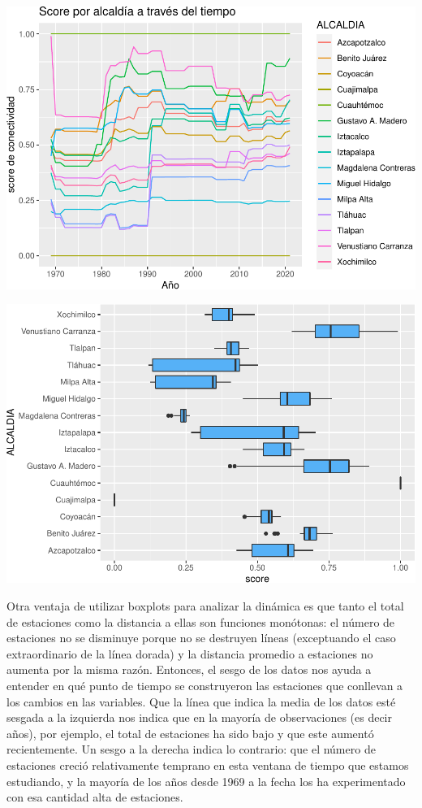 \documentclass[
  spanish,
]{article}
\begin{document}
\begin{center}\includegraphics{proyecto_files/figure-latex/unnamed-chunk-27-1} \end{center}

\begin{center}\includegraphics{proyecto_files/figure-latex/unnamed-chunk-28-1} \end{center}

Otra ventaja de utilizar boxplots para analizar la dinámica es que tanto
el total de estaciones como la distancia a ellas son funciones
monótonas: el número de estaciones no se disminuye porque no se
destruyen líneas (exceptuando el caso extraordinario de la línea dorada)
y la distancia promedio a estaciones no aumenta por la misma razón.
Entonces, el sesgo de los datos nos ayuda a entender en qué punto de
tiempo se construyeron las estaciones que conllevan a los cambios en las
variables. Que la línea que indica la media de los datos esté sesgada a
la izquierda nos indica que en la mayoría de observaciones (es decir
años), por ejemplo, el total de estaciones ha sido bajo y que este
aumentó recientemente. Un sesgo a la derecha indica lo contrario: que el
número de estaciones creció relativamente temprano en esta ventana de
tiempo que estamos estudiando, y la mayoría de los años desde 1969 a la
fecha los ha experimentado con esa cantidad alta de estaciones.
\end{document}
